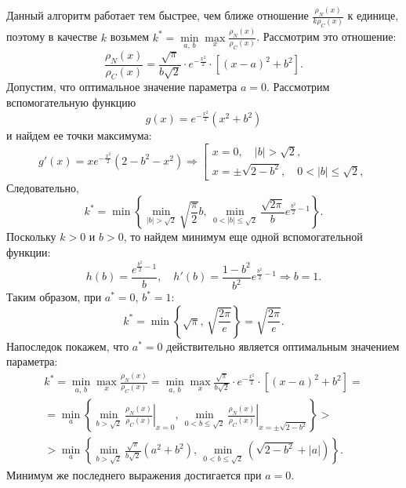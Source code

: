 Данный алгоритм работает тем быстрее, чем ближе отношение $\frac{\rho_N(x)}{k\rho_C(x)}$ к единице, поэтому в качестве $k$ возьмем $k^* = \min\limits_{a,\,b}\max\limits_{x}\frac{\rho_N(x)}{\rho_C(x)}$. Рассмотрим это отношение:
$$
        \frac{\rho_N(x)}{\rho_C(x)}
        =
        \frac{\sqrt{\pi}}{b\sqrt{2}}
        \cdot
        e^{-\frac{x^2}{2}}
        \cdot
        [(x - a)^2 + b^2].
$$
Допустим, что оптимальное значение параметра $a = 0$. Рассмотрим вспомогательную функцию
$$
        g(x) = e^{-\frac{x^2}{2}}(x^2 + b^2)
$$
и найдем ее точки максимума:
$$
        g'(x) = xe^{-\frac{x^2}{2}}(2 - b^2 - x^2)
        \Longrightarrow
        \left[\begin{aligned}
                x = 0, \quad |b| > \sqrt {2}, \\
                x = \pm \sqrt{2 - b^2}, \quad 0 < |b| \leqslant \sqrt{2},
        \end{aligned}\right.
$$
Следовательно,
$$
        k^* = \min\left\{
        \min\limits_{|b| > \sqrt{2}} \sqrt{\frac{\pi}{2}}b,\, \min\limits_{0 < |b| \leqslant \sqrt{2}} \frac{\sqrt{2\pi}}{b} e^{\frac{b^2}{2} - 1}
        \right\}.
$$
Поскольку $k> 0$ и $b > 0$, то найдем минимум еще одной вспомогательной функции:
$$
        h(b) = \frac{e^{\frac{b^2}{2}-1}}{b},\quad h'(b) = \frac{1-b^2}{b^2} e^{\frac{b^2}{2}-1}
        \Longrightarrow b = 1.
$$
Таким образом, при $a^* = 0$, $b^* = 1$:
$$
        k^* = \min\left\{
        \sqrt{\pi},\,
        \sqrt{\frac{2\pi}{e}}
        \right\}
        =
        \sqrt{\frac{2\pi}{e}}.
$$
Напоследок покажем, что $a^* = 0$ действительно является оптимальным значением параметра:
\begin{multline*}
        k^*
        =
        \min\limits_{a,\,b}\max\limits_{x}\frac{\rho_N(x)}{\rho_C(x)}
        =
        \min\limits_{a,\,b}\max\limits_{x} \frac{\sqrt{\pi}}{b\sqrt{2}}
        \cdot
        e^{-\frac{x^2}{2}}
        \cdot
        [(x - a)^2 + b^2]
        = \\ =
        \min\limits_a \left\{
                \min\limits_{b > \sqrt{2}} \left.
                \frac{\rho_N(x)}{\rho_C(x)}
                \right|_{x = 0},\,
        \min\limits_{0 < b \leqslant \sqrt{2}} \left.
                \frac{\rho_N(x)}{\rho_C(x)}
                \right|_{x = \pm \sqrt{2 - b^2}}
        \right\}
        >\\>
        \min\limits_a \left\{
                \min\limits_{b > \sqrt{2}}
                \frac{\sqrt{\pi}}{b\sqrt{2}}(a^2 + b^2),\,
        \min\limits_{0 < b \leqslant \sqrt{2}} 
                (\sqrt{2 - b^2} + |a|)
        \right\}.
\end{multline*}
Минимум же последнего выражения достигается при $a = 0$.


